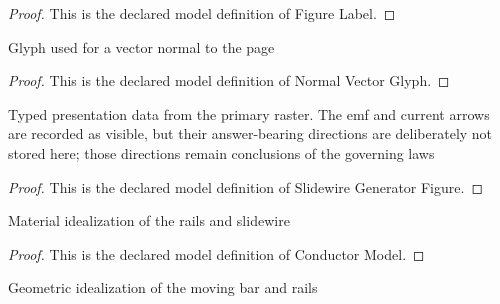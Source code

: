 \begin{proof}
  This is the declared model definition of Figure Label.
\end{proof}
\begin{definition}
  \label{def:physics:phyx-mini-0918:phyxminiproblems-problemphyxmini0918-normalvectorglyph}
  Glyph used for a vector normal to the page
\end{definition}
\begin{proof}
  This is the declared model definition of Normal Vector Glyph.
\end{proof}
\begin{definition}
  \label{def:physics:phyx-mini-0918:phyxminiproblems-problemphyxmini0918-slidewiregeneratorfigure}
  Typed presentation data from the primary raster. The emf and current arrows are recorded as visible, but their answer-bearing directions are deliberately not stored here; those directions remain conclusions of the governing laws
\end{definition}
\begin{proof}
  This is the declared model definition of Slidewire Generator Figure.
\end{proof}
\begin{definition}
  \label{def:physics:phyx-mini-0918:phyxminiproblems-problemphyxmini0918-conductormodel}
  Material idealization of the rails and slidewire
\end{definition}
\begin{proof}
  This is the declared model definition of Conductor Model.
\end{proof}
\begin{definition}
  \label{def:physics:phyx-mini-0918:phyxminiproblems-problemphyxmini0918-slidewiregeometrymodel}
  Geometric idealization of the moving bar and rails
\end{definition}
